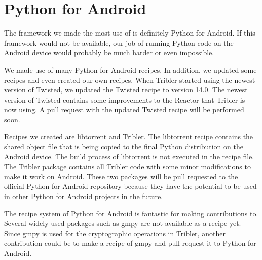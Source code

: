 \section{Python for Android}
	The framework we made the most use of is definitely Python for Android. If this framework would not be available, our job of running Python code on the Android device would probably be much harder or even impossible.
	
	We made use of many Python for Android recipes. In addition, we updated some recipes and even created our own recipes. When Tribler started using the newest version of Twisted, we updated the Twisted recipe to version 14.0. The newest version of Twisted contains some improvements to the Reactor that Tribler is now using. A pull request with the updated Twisted recipe will be performed soon.
	
	Recipes we created are libtorrent and Tribler. The libtorrent recipe contains the shared object file that is being copied to the final Python distribution on the Android device. The build process of libtorrent is not executed in the recipe file. The Tribler package contains all Tribler code with some minor modifications to make it work on Android. These two packages will be pull requested to the official Python for Android repository because they have the potential to be used in other Python for Android projects in the future.
	
	The recipe system of Python for Android is fantastic for making contributions to. Several widely used packages such as gmpy are not available as a recipe yet. Since gmpy is used for the cryptographic operations in Tribler, another contribution could be to make a recipe of gmpy and pull request it to Python for Android.